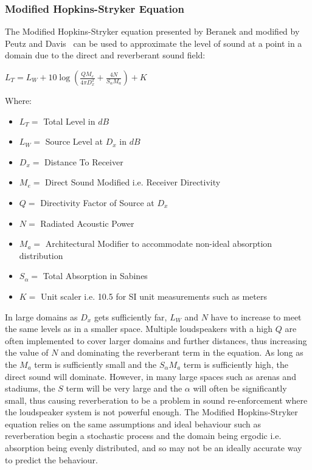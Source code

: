 \subsubsection{Modified Hopkins-Stryker Equation}
The Modified Hopkins-Stryker equation presented by Beranek and modified by Peutz and Davis~\cite{Davis2014} can be used to approximate the level of sound at a point in a domain due to the direct and reverberant sound field:\\
\begin{center}
$L_T = L_W + 10 \log \left( \frac{Q M_e}{4 \pi D_x^2} + \frac{4 N}{S_\alpha M_a} \right) + K$
\end{center}
Where:
\begin{itemize}
\item $L_T =$ Total Level in $dB$
\item $L_W =$ Source Level at $D_x$ in $dB$
\item $D_x =$ Distance To Receiver 
\item $M_e =$ Direct Sound Modified i.e. Receiver Directivity
\item $Q =$ Directivity Factor of Source at $D_x$
\item $N =$ Radiated Acoustic Power
\item $M_a =$ Architectural Modifier to accommodate non-ideal absorption distribution
\item $S_\alpha =$ Total Absorption in Sabines
\item $K =$ Unit scaler i.e. 10.5 for SI unit measurements such as meters
\end{itemize}
In large domains as $D_x$ gets sufficiently far, $L_W$ and $N$ have to increase to meet the same levels as in a smaller space. Multiple loudspeakers with a high $Q$ are often implemented   to cover larger domains and further distances, thus increasing the value of $N$ and dominating the reverberant term in the equation. As long as the $M_a$ term is sufficiently small and the $S_\alpha M_a$ term is sufficiently high, the direct sound will dominate. However, in many large spaces such as arenas and stadiums, the $S$ term will be very large and the $\alpha$ will often be significantly small, thus causing reverberation to be a problem in sound re-enforcement where the loudspeaker system is not powerful enough. The Modified Hopkins-Stryker equation relies  on the same assumptions and ideal behaviour such as reverberation begin a stochastic process and the domain being ergodic i.e. absorption being evenly distributed, and so may not be an ideally accurate way to predict the behaviour. 

